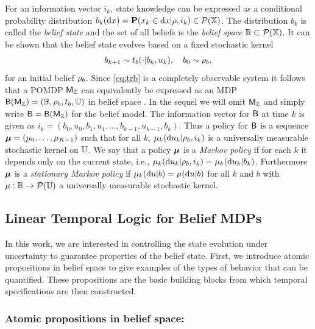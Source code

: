 \documentclass{ifacconf}
\begin{document}
For an information vector $i_k$, state knowledge can be expressed as a conditional probability distribution $b_k( \mathrm{d} x )=\mathbf{P}(x_k\in \mathrm{d} x |\rho,i_k)\in \mathcal P ({\mathbb{X}})$. The distribution $b_k$ is called the \emph{belief state} and the set of all beliefs is the \emph{belief space} $\mathbb{B}\subset \mathcal P({\mathbb{X}})$. It can be shown that the belief state evolves based on a fixed stochastic kernel
\begin{align}
\label{eq:trb}
	 b_{k+1} \sim t_b(\cdot|b_k,u_k), \quad b_0 \sim \rho_b,
\end{align}
for an initial belief $\rho_b$. Since \eqref{eq:trb} is a completely observable system it follows that a POMDP $\mathsf{M}_{{\mathbb{Z}}}$ can equivalently be expressed as an MDP $\mathsf{B}(\mathsf{M}_{{\mathbb{Z}}}) = (\mathbb{B}, \rho_b, t_b, {\mathbb{U}})$ in belief space \citep{bertsekas2004stochastic}. In the sequel we will omit $\mathsf{M}_{{\mathbb{Z}}}$ and simply write $\mathsf{B} = \mathsf{B}(\mathsf{M}_{{\mathbb{Z}}})$ for the belief model. The information vector for $\mathsf{B}$ at time $k$ is given as $i_k=(b_0, u_0, b_1, u_1, \ldots, b_{k-1}, u_{k-1}, b_k)$. Thus a policy for $\mathsf{B}$ is a sequence ${\boldsymbol{\mu}}=({\mu}_0,\ldots,{\mu}_{K-1})$ such that for all $k$, ${\mu}_k(\mathrm{d}u_k|\rho_b, i_k)$ is a universally measurable stochastic kernel on ${\mathbb{U}}$.	We say that a policy ${\boldsymbol{\mu}}$ is a \emph{Markov policy} if for each $k$ it depends only on the current state, i.e., ${\mu}_k(\mathrm{d} u_k|\rho_b, i_k) = {\mu}_k(\mathrm{d} u_k| b_k)$. Furthermore ${\boldsymbol{\mu}}$ is a \emph{stationary Markov policy} if ${\mu}_k(\mathrm{d} u| b)=  {\mu}(\mathrm{d} u| b)$  for all $k$ and $b$ with ${\mu}:\mathbb B\rightarrow \mathcal{P}({\mathbb{U}})$ a universally measurable stochastic kernel. %


\subsection{Linear Temporal Logic for Belief MDPs}

In this work, we are interested in controlling the state evolution under uncertainty to guarantee properties of the belief state. First, we introduce atomic propositions in belief space to give examples of the types of behavior that can be quantified. These propositions are the basic building blocks from which temporal specifications are then constructed.

\subsubsection{Atomic propositions in belief space:}
\end{document}
